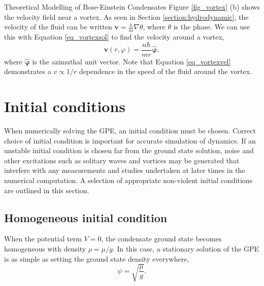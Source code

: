 \begin{chapter}{\label{cha:theoretical_model}Theoretical Modelling of Bose-Einstein Condensates}
 Figure \ref{fig_vortex} (b) shows the velocity field near a vortex. As seen in Section \ref{section:hydrodynamic}, the velocity of the fluid can be written $\mathbf{v} = \frac{h}{m}\nabla\theta$, where $\theta$ is the phase. We can use this with Equation \ref{eq_vortexsol} to find the velocity around a vortex,
	\begin{equation}\label{eq_vortexvel}
	\mathbf{v}(r,\varphi) = \frac{n \hbar}{mr} {\bm{\hat{\varphi}}},
	\end{equation}
where ${\bm{\hat{\varphi}}}$ is the azimuthal unit vector. Note that Equation \ref{eq_vortexvel} demonstrates a $v \propto 1/r$ dependence in the speed of the fluid around the vortex.

\section{\label{section:inital} Initial conditions}
	When numerically solving the GPE, an initial condition must be chosen. Correct choice of initial condition is important for accurate simulation of dynamics. If an unstable initial condition is chosen far from the ground state solution, noise and other excitations such as solitary waves and vortices may be generated that interfere with any measurements and studies undertaken at later times in the numerical computation. A selection of appropriate non-violent initial conditions are outlined in this section. 
	\subsection{\label{section:homoinit} Homogeneous initial condition}
	When the potential term $V=0$, the condensate ground state becomes homogeneous with density $\rho=\mu/g$. In this case, a stationary solution of the GPE is as simple as setting the ground state density everywhere,
	\begin{equation}
		\psi = \sqrt{\frac{\mu}{g}}.
		\label{eq:homoinit}
	\end{equation}


\end{chapter}

